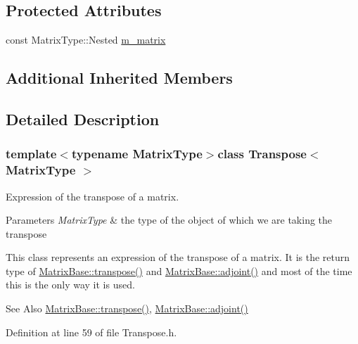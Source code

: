 \subsection*{Protected Attributes}
\begin{DoxyCompactItemize}
\item 
const Matrix\-Type\-::\-Nested \hyperlink{class_transpose_a04dcd47838279b3a53d5651989f4a8cb}{m\-\_\-matrix}
\end{DoxyCompactItemize}
\subsection*{Additional Inherited Members}


\subsection{Detailed Description}
\subsubsection*{template$<$typename Matrix\-Type$>$class Transpose$<$ Matrix\-Type $>$}

Expression of the transpose of a matrix. 


\begin{DoxyParams}{Parameters}
{\em Matrix\-Type} & the type of the object of which we are taking the transpose\\
\hline
\end{DoxyParams}
This class represents an expression of the transpose of a matrix. It is the return type of \hyperlink{class_matrix_base_a794fe4b04caa197931bb688ce0dc7e43}{Matrix\-Base\-::transpose()} and \hyperlink{class_matrix_base_a1b377fccb4180e17272feea7fc66b1b8}{Matrix\-Base\-::adjoint()} and most of the time this is the only way it is used.

\begin{DoxySeeAlso}{See Also}
\hyperlink{class_matrix_base_a794fe4b04caa197931bb688ce0dc7e43}{Matrix\-Base\-::transpose()}, \hyperlink{class_matrix_base_a1b377fccb4180e17272feea7fc66b1b8}{Matrix\-Base\-::adjoint()} 
\end{DoxySeeAlso}


Definition at line 59 of file Transpose.\-h.




